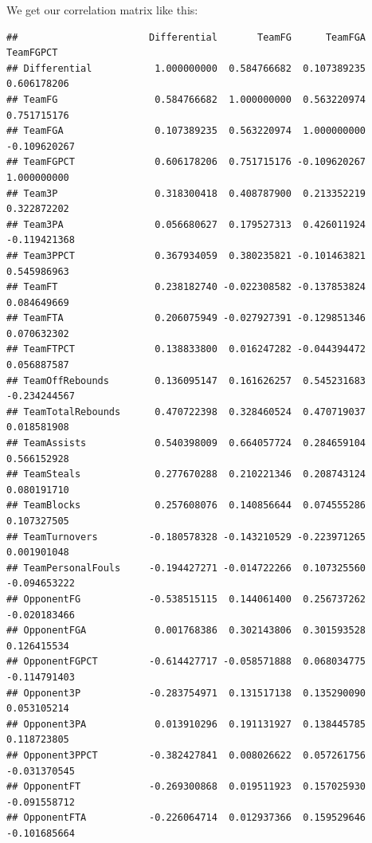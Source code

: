 \documentclass[]{book}
\newenvironment{Shaded}{\begin{snugshade}}{\end{snugshade}}
\newcommand{\KeywordTok}[1]{\textcolor[rgb]{0.13,0.29,0.53}{\textbf{#1}}}
\newcommand{\NormalTok}[1]{#1}
\newcommand{\OperatorTok}[1]{\textcolor[rgb]{0.81,0.36,0.00}{\textbf{#1}}}
\newcommand{\StringTok}[1]{\textcolor[rgb]{0.31,0.60,0.02}{#1}}
\begin{document}
We get our correlation matrix like this:

\begin{Shaded}
\end{Shaded}

\begin{verbatim}
##                       Differential       TeamFG      TeamFGA    TeamFGPCT
## Differential           1.000000000  0.584766682  0.107389235  0.606178206
## TeamFG                 0.584766682  1.000000000  0.563220974  0.751715176
## TeamFGA                0.107389235  0.563220974  1.000000000 -0.109620267
## TeamFGPCT              0.606178206  0.751715176 -0.109620267  1.000000000
## Team3P                 0.318300418  0.408787900  0.213352219  0.322872202
## Team3PA                0.056680627  0.179527313  0.426011924 -0.119421368
## Team3PPCT              0.367934059  0.380235821 -0.101463821  0.545986963
## TeamFT                 0.238182740 -0.022308582 -0.137853824  0.084649669
## TeamFTA                0.206075949 -0.027927391 -0.129851346  0.070632302
## TeamFTPCT              0.138833800  0.016247282 -0.044394472  0.056887587
## TeamOffRebounds        0.136095147  0.161626257  0.545231683 -0.234244567
## TeamTotalRebounds      0.470722398  0.328460524  0.470719037  0.018581908
## TeamAssists            0.540398009  0.664057724  0.284659104  0.566152928
## TeamSteals             0.277670288  0.210221346  0.208743124  0.080191710
## TeamBlocks             0.257608076  0.140856644  0.074555286  0.107327505
## TeamTurnovers         -0.180578328 -0.143210529 -0.223971265  0.001901048
## TeamPersonalFouls     -0.194427271 -0.014722266  0.107325560 -0.094653222
## OpponentFG            -0.538515115  0.144061400  0.256737262 -0.020183466
## OpponentFGA            0.001768386  0.302143806  0.301593528  0.126415534
## OpponentFGPCT         -0.614427717 -0.058571888  0.068034775 -0.114791403
## Opponent3P            -0.283754971  0.131517138  0.135290090  0.053105214
## Opponent3PA            0.013910296  0.191131927  0.138445785  0.118723805
## Opponent3PPCT         -0.382427841  0.008026622  0.057261756 -0.031370545
## OpponentFT            -0.269300868  0.019511923  0.157025930 -0.091558712
## OpponentFTA           -0.226064714  0.012937366  0.159529646 -0.101685664

\end{verbatim}
\end{document}
